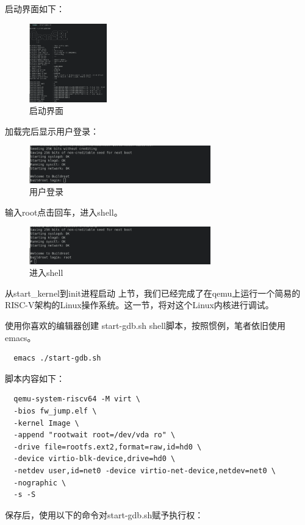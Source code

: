 \documentclass[lang=cn,10pt]{elegantbook}
\begin{document}
\newpage
启动界面如下：
\begin{figure}[htbp]
  \centering
  \includegraphics[width=0.3\textwidth]{image/image-20231105103328525.png}
  \caption{启动界面}
\end{figure}

加载完后显示用户登录：
\begin{figure}[htbp]
  \centering
  \includegraphics[width=0.7\textwidth]{image/image-20231105103401143.png}
  \caption{用户登录}
\end{figure}

输入root点击回车，进入shell。
\begin{figure}[htbp]
  \centering
  \includegraphics[width=0.7\textwidth]{image/image-20231105103508731.png}
  \caption{进入shell}
\end{figure}

从start\_kernel到init进程启动
上节，我们已经完成了在qemu上运行一个简易的RISC-V架构的Linux操作系统。这一节，将对这个Linux内核进行调试。

使用你喜欢的编辑器创建 start-gdb.sh shell脚本，按照惯例，笔者依旧使用emacs。

\begin{lstlisting}
  emacs ./start-gdb.sh
\end{lstlisting}
脚本内容如下：

\begin{lstlisting}
  qemu-system-riscv64 -M virt \
  -bios fw_jump.elf \
  -kernel Image \
  -append "rootwait root=/dev/vda ro" \
  -drive file=rootfs.ext2,format=raw,id=hd0 \
  -device virtio-blk-device,drive=hd0 \
  -netdev user,id=net0 -device virtio-net-device,netdev=net0 \
  -nographic \
  -s -S
\end{lstlisting}
保存后，使用以下的命令对start-gdb.sh赋予执行权：
\end{document}
